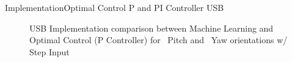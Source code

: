 \documentclass{beamer}
\begin{document}
%
\begin{frame}{Implementation}{Optimal Control P and PI Controller USB}
    \begin{figure}
      \centering
      \caption{USB Implementation comparison between Machine Learning and Optimal Control (P Controller) for ~Pitch and ~Yaw orientations w/ Step Input}
      \label{fig:PvPIVoltage_USB}
    \end{figure}
\end{frame}
\end{document}
